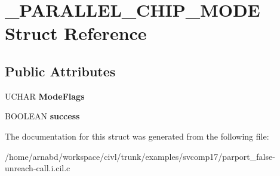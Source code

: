 \hypertarget{struct__PARALLEL__CHIP__MODE}{}\section{\+\_\+\+P\+A\+R\+A\+L\+L\+E\+L\+\_\+\+C\+H\+I\+P\+\_\+\+M\+O\+D\+E Struct Reference}
\label{struct__PARALLEL__CHIP__MODE}
\subsection*{Public Attributes}
\begin{DoxyCompactItemize}
\item 
\hypertarget{struct__PARALLEL__CHIP__MODE_a48b33fd5924d87c01eedefceca1d82b4}{}U\+C\+H\+A\+R {\bfseries Mode\+Flags}\label{struct__PARALLEL__CHIP__MODE_a48b33fd5924d87c01eedefceca1d82b4}

\item 
\hypertarget{struct__PARALLEL__CHIP__MODE_a1ec584112d887ba4813d0076a594676f}{}B\+O\+O\+L\+E\+A\+N {\bfseries success}\label{struct__PARALLEL__CHIP__MODE_a1ec584112d887ba4813d0076a594676f}

\end{DoxyCompactItemize}


The documentation for this struct was generated from the following file\+:\begin{DoxyCompactItemize}
\item 
/home/arnabd/workspace/civl/trunk/examples/svcomp17/parport\+\_\+false-\/unreach-\/call.\+i.\+cil.\+c\end{DoxyCompactItemize}
